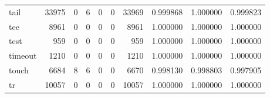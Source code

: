 \begin{longtable}{lrrrrrrrrr}
tail      &                                              33975 &                                                  0 &                                                  6 &                                                  0 &                                                  0 &                                              33969 &                                           0.999868 &                               1.000000 &                             0.999823 \\
tee       &                                               8961 &                                                  0 &                                                  0 &                                                  0 &                                                  0 &                                               8961 &                                           1.000000 &                               1.000000 &                             1.000000 \\
test      &                                                959 &                                                  0 &                                                  0 &                                                  0 &                                                  0 &                                                959 &                                           1.000000 &                               1.000000 &                             1.000000 \\
timeout   &                                               1210 &                                                  0 &                                                  0 &                                                  0 &                                                  0 &                                               1210 &                                           1.000000 &                               1.000000 &                             1.000000 \\
touch     &                                               6684 &                                                  8 &                                                  6 &                                                  0 &                                                  0 &                                               6670 &                                           0.998130 &                               0.998803 &                             0.997905 \\
tr        &                                              10057 &                                                  0 &                                                  0 &                                                  0 &                                                  0 &                                              10057 &                                           1.000000 &                               1.000000 &                             1.000000 \\

\end{longtable}
